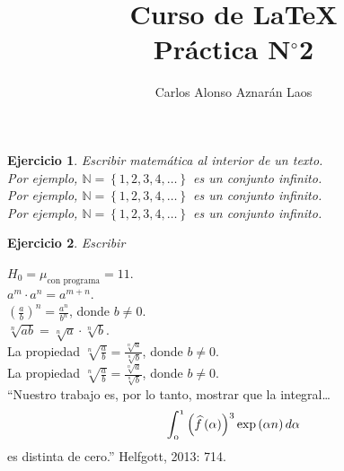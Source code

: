 \documentclass[12pt,a4paper]{article}
\author{Carlos Alonso Aznarán Laos}
\title{Curso de \LaTeX \\ Práctica N$^{\circ}$2}
\newtheorem{ejer}{Ejercicio} %
\begin{document}
\maketitle %

\begin{ejer}
	Escribir matemática al interior de un texto.\\
	\noindent Por ejemplo, $\mathbb{N}=\left\{1,2,3,4,\dotsc\right\}$ es un
	conjunto infinito.\\

	Por ejemplo, \(\mathbb{N}=\left\{1,2,3,4,\dotsc\right\}\) es un conjunto
	infinito.\\

	Por ejemplo, \begin{math}\mathbb{N}=\left\{1,2,3,4,\dotsc\right\}\end{math}
	es un conjunto infinito.\\
\end{ejer}

\begin{ejer}
	Escribir
\end{ejer}

$H_{0}=\mu_{\text{con programa}}=11$.\\

$a^{m}\cdot a^{n}=a^{m+n}$.\\

${\left(\frac{a}{b}\right)}^{n}=\frac{{a}^{n}}{{b}^{n}}$, donde $b\neq0$.\\

$\sqrt[n]{ab}=\sqrt[n]{a}\cdot\sqrt[n]{b}$.\\

La propiedad $\sqrt[n]{\frac{a}{b}}=\frac{\sqrt[n]{a}}{\sqrt[n]{b}}$, donde $b\neq0$.\\
La propiedad $\displaystyle\sqrt[n]{\frac{a}{b}}=\frac{\sqrt[n]{a}}{\sqrt[n]{b}}$, donde $b\neq0$.\\

``Nuestro trabajo es, por lo tanto, mostrar que la integral\ldots
\begin{displaymath}
	\mathnormal{
	\int_{0}^{1}
	{\left(\widehat{f}\left(\alpha\right)\right)}^{3}
	\exp\left(\alpha n\right) d\alpha
	}
\end{displaymath} es distinta de cero.'' Helfgott, 2013: 714.
\end{document}
